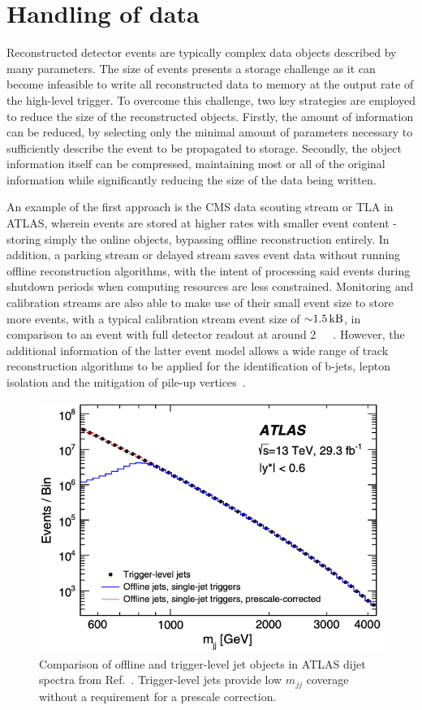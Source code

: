 \section{Handling of data}
\label{sec:data}

Reconstructed detector events are typically complex data objects described by many parameters. The size of events presents a storage challenge as it can become infeasible to write all reconstructed data to memory at the output rate of the high-level trigger. To overcome this challenge, two key strategies are employed to reduce the size of the reconstructed objects. Firstly, the amount of information can be reduced, by selecting only the minimal amount of parameters necessary to sufficiently describe the event to be propagated to storage. Secondly, the object information itself can be compressed, maintaining most or all of the original information while significantly reducing the size of the data being written.

An example of the first approach is the CMS data scouting stream or TLA in ATLAS, wherein events are stored at higher rates with smaller event content - storing simply the online objects, bypassing offline reconstruction entirely. In addition, a parking stream or delayed stream saves event data without running offline reconstruction algorithms, with the intent of processing said events during shutdown periods when computing resources are less constrained. Monitoring and calibration streams are also able to make use of their small event size to store more events, with a typical calibration stream event size of ${\sim}\SI{1.5}{\kilo\byte}$, in comparison to an event with full detector readout at around \SI{2}{\mega\byte}~\cite{cms2023development}. However, the additional information of the latter event model allows a wide range of track reconstruction algorithms to be applied for the identification of b-jets, lepton isolation and the mitigation of pile-up vertices~\cite{mia2014trackingcms,tosi2016trackingcms}. 

\begin{figure}[h!]
    \centering
    \includegraphics[width=0.55\linewidth]{images/atlas/ATLAS-TLA.png}
    \caption{Comparison of offline and trigger-level jet objects in ATLAS dijet spectra from Ref.~\cite{ATLAS:2018qto}. Trigger-level jets provide low $m_{jj}$ coverage without a requirement for a prescale correction.}
    \label{fig:trigger-level-efficiencies}
\end{figure}

